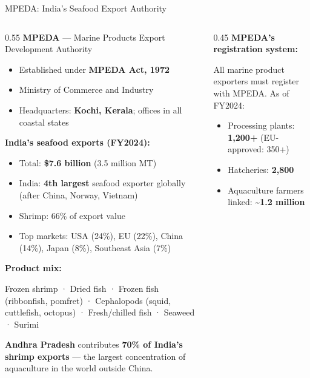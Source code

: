 \documentclass[
  ignorenonframetext,
  aspectratio=169,
]{beamer}
\makeatletter
\providecommand{\tightlist}{%
  \setlength{\itemsep}{0pt}\setlength{\parskip}{0pt}}
\let\quarto@originallabel\label
\DeclareRobustCommand*{\label}[1]{\quarto@originallabel{#1}}
\makeatother
\begin{document}
\begin{frame}{MPEDA: India's Seafood Export Authority}
\label{mpeda-indias-seafood-export-authority}
\begin{columns}[T]
\begin{column}{0.55\linewidth}
\textbf{MPEDA} --- Marine Products Export Development Authority

\begin{itemize}
\tightlist
\item
  Established under \textbf{MPEDA Act, 1972}
\item
  Ministry of Commerce and Industry
\item
  Headquarters: \textbf{Kochi, Kerala}; offices in all coastal states
\end{itemize}

\textbf{India's seafood exports (FY2024):}

\begin{itemize}
\tightlist
\item
  Total: \textbf{\$7.6 billion} (3.5 million MT)
\item
  India: \textbf{4th largest} seafood exporter globally (after China,
  Norway, Vietnam)
\item
  Shrimp: 66\% of export value
\item
  Top markets: USA (24\%), EU (22\%), China (14\%), Japan (8\%),
  Southeast Asia (7\%)
\end{itemize}

\textbf{Product mix:}

Frozen shrimp · Dried fish · Frozen fish (ribbonfish, pomfret) ·
Cephalopods (squid, cuttlefish, octopus) · Fresh/chilled fish · Seaweed
· Surimi

\textbf{Andhra Pradesh} contributes \textbf{70\% of India's shrimp
exports} --- the largest concentration of aquaculture in the world
outside China.
\end{column}

\begin{column}{0.45\linewidth}
\textbf{MPEDA's registration system:}

All marine product exporters must register with MPEDA. As of FY2024:

\begin{itemize}
\tightlist
\item
  Processing plants: \textbf{1,200+} (EU-approved: 350+)
\item
  Hatcheries: \textbf{2,800}
\item
  Aquaculture farmers linked: \textbf{\textasciitilde1.2 million}
\end{itemize}


\end{column}
\end{columns}
\end{frame}
\end{document}
